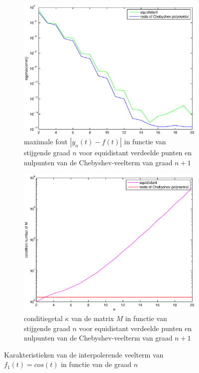 \documentclass[a4paper]{article}
\begin{document}
\begin{figure}
    \centering
    \begin{subfigure}[t]{0.45\textwidth}
        \centering
        \includegraphics[width=\textwidth]{Jona/error_global_cos.eps}
        \caption{maximale fout $|y_{n}(t)-f(t)|$ in functie van stijgende graad $n$ voor equidistant verdeelde punten en nulpunten van de Chebyshev-veelterm van graad $n+1$}
        \label{fig:error_global_cos}
    \end{subfigure}
    \begin{subfigure}[t]{0.45\textwidth}
        \centering
        \includegraphics[width=\textwidth]{Jona/condition_cos.eps}
        \caption{conditiegetal $\kappa$ van de matrix $M$ in functie van stijgende graad $n$ voor equidistant verdeelde punten en nulpunten van de Chebyshev-veelterm van graad $n+1$}
        \label{fig:condition_cos}
    \end{subfigure}
    \hfill
    \caption{Karakteristieken van de interpolerende veelterm van $f_{1}(t) = cos(t)$ in functie van de graad $n$}
    \label{fig:characteristics_cos}
    \end{figure}
    
\end{document}
